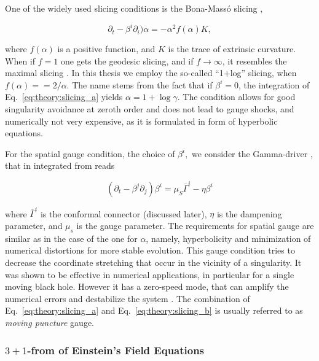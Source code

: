 One of the widely used slicing conditions is the Bona-Mass{\'o} slicing \citep{Bona:1994dr}, 

\begin{equation}
    \partial_t - \beta^i\partial_i)\alpha = -\alpha^2 f(\alpha)K,
    \label{eq:theory:slicing_a}
\end{equation}

where $f(\alpha)$ is a positive function, and $K$ is the trace of extrinsic curvature.
When if $f=1$ one gets the geodesic slicing, and if $f\rightarrow\infty$, it resembles the 
maximal slicing \citep{Baumgarte:2002jm}.
In this thesis we employ the so-called ``1+log'' slicing, when $f(\alpha) = = 2/\alpha$.
The name stems from the fact that if $\beta^i = 0$, the integration of Eq.~\eqref{eq:theory:slicing_a} 
yields $\alpha = 1 + \log \gamma$.
The condition allows for good singularity avoidance at zeroth order \cite{Alcubierre:2002kk} and 
does not lead to gauge shocks, and numerically not very expensive, as it is formulated in form 
of hyperbolic equations.

For the spatial gauge condition, the choice of $\beta^i,$ we consider the Gamma-driver 
\cite{Alcubierre:2002kk,vanMeter:2006vi}, that in integrated from reads 

\begin{equation}
    (\partial_t - \beta^j\partial_j)\beta^i = \mu_S\overline{\Gamma}^i - \eta\beta^i
    \label{eq:theory:slicing_b}
\end{equation}

where $\overline{\Gamma}^i$ is the conformal connector (discussed later), $\eta$ is the 
dampening parameter, and $\mu_s$ is the gauge parameter.
The requirements for spatial gauge are similar as in the case of the one for $\alpha$, 
namely, hyperbolicity and minimization of numerical distortions for more stable evolution. 
This gauge condition tries to decrease the coordinate stretching that occur in the 
vicinity of a singularity. It was shown to be effective in numerical applications, 
in particular for a single moving black hole. However it has a zero-speed mode, 
that can amplify the numerical errors and destabilize the system \citep{vanMeter:2006vi}.
%
The combination of Eq.~\eqref{eq:theory:slicing_a} and Eq.~\eqref{eq:theory:slicing_b}
is usually referred to as \textit{moving puncture} gauge. 


\subsubsection{$3+1$-from of Einstein's Field Equations}


